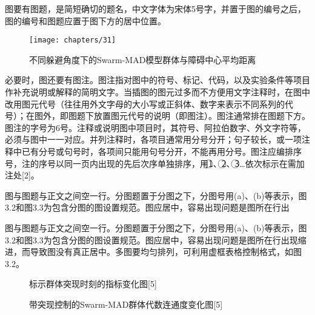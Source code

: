 图要有图题，是简短确切的题名，中文字体为宋体5号字，并置于图的编号之后，图的编号和图题应置于图下方的居中位置。\\


\begin{figure} 
	\centering
	\begin{minipage}[t]{0.8\linewidth} 
		\centering 
		\texttt{[image: chapters/31]}
		\caption{不同躲避角度下的Swarm-MAD模型群体与障碍中心平均距离} 
		\label{fig:3.1} 
	\end{minipage}%
\end{figure}

必要时，图还要有图注。图注指对图中的符号、标记、代码，以及实验条件等项目作补充说明或解释的简明文字。当插图的图元过多而不方便用文字注释时，在图中改用图元代号（往往用外文字母的大小写或正斜体、数字来表示不同系列的代号）；在图外，即图题下放置图元代号的说明（即图注）。图注通常排在图题下方。图注的字号为6号。注释或说明图中项目时，其符号、阿拉伯数字、外文字符等，必须与图中一一对应。并列注释时，各项目通常用分号分开；句子较长，或一项注释中已有分号或句号时，各项间只能用句号分开，不能再用分号。图注应编排序号，注的序号以同一页内出现的先后次序单独排序，用\textcircled{1}、\textcircled{2}、\textcircled{3}…依次标示在需加注处[2]。

图与图题与正文之间空一行。分图题置于分图之下，分图号用(a)、(b)等表示，图3.2和图3.3为包含分图的图设置规范。图应居中，容易出现问题是图所在行出

图与图题与正文之间空一行。分图题置于分图之下，分图号用(a)、(b)等表示，图3.2和图3.3为包含分图的图设置规范。图应居中，容易出现问题是图所在行出现缩进，而导致图没有真正居中。多图要均匀排列，可利用虚框表格控制格式，如图3.2。



\begin{figure} 
	\centering 
	\hspace{1in} 
	\caption{标示群体突现时刻的指标变化图[5]} 
	\label{fig:subfig} %
\end{figure}

\begin{figure} 
	\centering 
	\hspace{1in} 
	\caption{带突现控制的Swarm-MAD群体代数连通度变化图[5]} 
	\label{fig:subfig} %
\end{figure}

